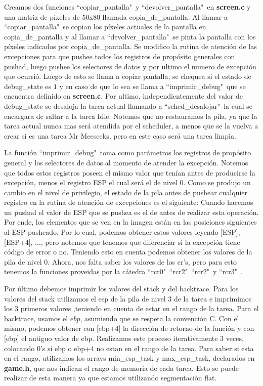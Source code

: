 \documentclass[a4paper]{article}
\begin{document}
\justify
Creamos dos funciones ``copiar_pantalla"\ y ``devolver_pantalla"\ en \textbf{screen.c} y una matriz de píxeles de 50x80 llamada copia_de_pantalla. Al llamar a ``copiar_pantalla"\ se copian los píxeles actuales de la pantalla en copia_de_pantalla y al llamar a ``devolver_pantalla"\ se pinta la pantalla con los píxeles indicados por copia_de_pantalla.
\justify
Se modifico la rutina de atención de las excepciones para que pushee todos los registros de propósito generales con pushad, luego pushee los selectores de datos y por ultimo el numero de excepción que ocurrió. Luego de esto se llama a copiar pantalla, se chequea si el estado de debug_state es $1$ y en caso de que lo sea se llama a ``imprimir_debug"\ que se encuentra definido en \textbf{screen.c}. Por ultimo, independientemente del valor de debug_state se desaloja la tarea actual llamando a ``sched_desalojar"\, la cual se encargara de saltar a la tarea Idle. Notemos que no restauramos la pila, ya que la tarea actual nunca mas será atendida por el scheduler, a menos que se la vuelva a crear si es una tarea Mr Meeseeks, pero en este caso será una tarea limpia.

\justify
La función ``imprimir_debug"\ toma como parámetros los registros de propósito general y los selectores de datos al momento de atender la excepción. Notemos que todos estos registros poseen el mismo valor que tenían antes de producirse la excepción, menos el registro ESP el cual será el de nivel 0. Como se produjo un cambio en el nivel de privilegio, el estado de la pila antes de pushear cualquier registro en la rutina de atención de excepciones es el siguiente:
Cuando hacemos un pushad el valor de ESP que se pushea es el de antes de realizar esta operación. Por ende, los elementos que se ven en la imagen están en las posiciones siguientes al ESP pusheado. Por lo cual, podemos obtener estos valores leyendo [ESP], [ESP+4], $\dots$, pero notemos que tenemos que diferenciar si la excepción tiene código de error o no. Teniendo esto en cuenta podemos obtener los valores de la pila de nivel 0. Ahora, nos falta saber los valores de los cr's, pero para esto tenemos la funciones proveidas por la cátedra ``rcr0"\, ``rcr2"\, ``rcr2"\ y ``rcr3"\ .

\justify
Por último debemos imprimir los valores del stack y del backtrace. Para los valores del stack utilizamos el esp de la pila de nivel $3$ de la tarea e imprimimos los $3$ primeros valores ,teniendo en cuenta de estar en el rango de la tarea. Para el backtrace, usamos el $ebp$, asumiendo que se respeta la convención C. Con el mismo, podemos obtener con [ebp+4] la dirección de retorno de la función y con [ebp] el antiguo valor de ebp. Realizamos este proceso iterativamente 3 veces, colocando 0's si ebp o ebp+4 no estan en el rango de la tarea. Para saber si esta en el rango, utilizamos los arrays min_esp_task y max_esp_task, declarados en \textbf{game.h}, que nos indican el rango de memoria de cada tarea. Esto se puede realizar de esta manera ya que estamos utilizando segmentación flat.
\end{document}
